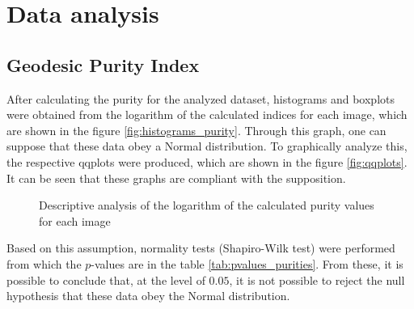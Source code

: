 \documentclass[12pt]{article}
\begin{document}
\section{Data analysis}

\subsection{Geodesic Purity Index}

After calculating the purity for the analyzed dataset, histograms and boxplots were obtained from the logarithm of the calculated indices for each image, which are shown in the figure \ref{fig:histograms_purity}. Through this graph, one can suppose that these data obey a Normal distribution. To graphically analyze this, the respective qqplots were produced, which are shown in the figure \ref{fig:qqplots}. It can be seen that these graphs are compliant with the supposition.

\begin{figure}[hbt]
  \centering
  \caption{Descriptive analysis of the logarithm of the calculated purity values for each image}
  \label{fig:desc_analysis}
\end{figure}

Based on this assumption, normality tests (Shapiro-Wilk test) were performed from which the $p$-values are in the table \ref{tab:pvalues_purities}. From these, it is possible to conclude that, at the level of $0.05$, it is not possible to reject the null hypothesis that these data obey the Normal distribution. 
\end{document}
